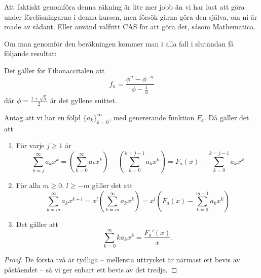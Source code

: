 \documentclass[nobib]{tufte-handout}
\begin{document}
Att faktiskt genomföra denna räkning är lite mer jobb än vi har lust att göra under föreläsningarna i denna kursen, men försök gärna göra den själva, om ni är roade av sådant. Eller använd valfritt CAS för att göra det, såsom Mathematica.

Om man genomför den beräkningen kommer man i alla fall i slutändan få följande resultat:

\begin{proposition}
    Det gäller för Fibonaccitalen att
    $$f_n = \frac{\phi^n - \phi^{-n}}{\phi - \frac{1}{\phi}}$$
    där $\phi = \frac{1 + \sqrt{5}}{2}$ är det gyllene snittet.
\end{proposition}

\begin{lemma}\label{lemma_generating_function_calc_rules}
    Antag att vi har en följd $\{a_k\}_{k=0}^\infty$, med genererande funktion $F_a$. Då gäller det att
    \begin{enumerate}
        \item För varje $j \geq 1$ är
        $$\sum_{k = j}^{\infty} a_k x^k = \left(\sum_{k=0}^{\infty}a_k x^k\right) - \left(\sum_{k=0}^{k=j-1} a_kx^k\right) = F_a(x) - \sum_{k=0}^{k=j-1} a_kx^k$$
        \item För alla $m \geq 0$, $l \geq -m$ gäller det att
        $$\sum_{k=m}^{\infty} a_k x^{k + l} = x^l\left(\sum_{k=m}^{\infty} a_k x^{k}\right) = x^l\left(F_a(x) - \sum_{k=0}^{m-1} a_k x^k\right)$$
        \item Det gäller att
        $$\sum_{k=0}^{\infty} k a_k x^k = \frac{F_a'(x)}{x}.$$
        
    \end{enumerate}
    \begin{proof}
        De första två är tydliga -- mellersta uttrycket är närmast ett bevis av påståendet -- så vi ger enbart ett bevis av det tredje.


\end{proof}
\end{lemma}
\end{document}
